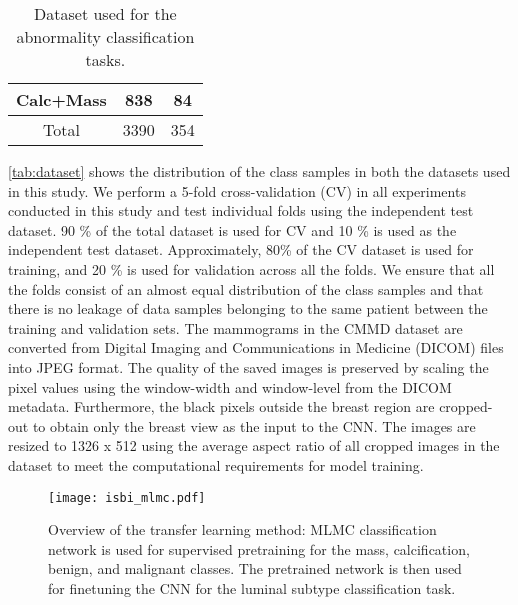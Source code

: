 \documentclass{article}
\begin{document}
\begin{table}[!ht]
\begin{subtable}{\linewidth}
\begin{tabular}{c  c  c }
          
        
        Calc+Mass       &  838                     & 84                 \\ 
        
        
        \midrule
        Total           &  3390                    & 354                \\ 
        
       
         \bottomrule
        
        \end{tabular}
        \caption{Dataset used for the abnormality classification tasks.}
        
        \label{tab:datasetb}
    \end{subtable}
\end{table}


\cref{tab:dataset} shows the distribution of the class samples in both the datasets used in this study. We perform a 5-fold cross-validation (CV) in all experiments conducted in this study and test individual folds using the independent test dataset. 90 \% of the total dataset is used for CV and 10 \% is used as the independent test dataset. Approximately, 80\% of the CV dataset is used for training, and 20 \% is used for validation across all the folds. We ensure that all the folds consist of an almost equal distribution of the class samples and that there is no leakage of data samples belonging to the same patient between the training and validation sets. The mammograms in the CMMD dataset are converted from Digital Imaging and Communications in Medicine (DICOM) files into JPEG format. The quality of the saved images is preserved by scaling the pixel values using the window-width and window-level from the DICOM metadata. Furthermore, the black pixels outside the breast region are cropped-out to obtain only the breast view as the input to the CNN. The images are resized to 1326 x 512 using the average aspect ratio of all cropped images in the dataset to meet the computational requirements for model training.  


\begin{figure*}[htb]

\begin{minipage}[b]{1.0\linewidth}
  \centering
  \centerline{\texttt{[image: isbi\_mlmc.pdf]}}


\end{minipage}
\caption{Overview of the transfer learning method: MLMC classification network is used for supervised pretraining for the mass, calcification, benign, and malignant classes. The pretrained network is then used for finetuning the CNN for the luminal subtype classification task.}
\label{fig1}
\end{figure*}
\end{document}
